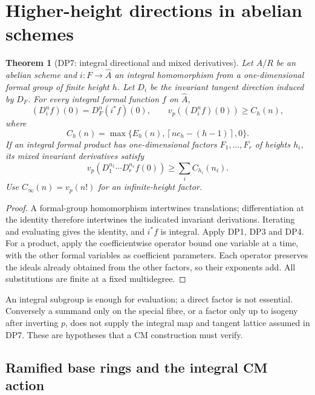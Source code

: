 \documentclass[11pt,a4paper]{article}
\newtheorem{theorem}{Theorem}[section]
\theoremstyle{definition}\newtheorem{remark}[theorem]{Remark}
\newcommand{\vp}{v_p}\newcommand{\dR}{\mathrm{dR}}\newcommand{\crys}{\mathrm{crys}}
\newcommand{\ceil}[1]{\left\lceil #1\right\rceil}\newcommand{\floor}[1]{\left\lfloor #1\right\rfloor}
\begin{document}
\section{Higher-height directions in abelian schemes}

\begin{theorem}[DP7: integral directional and mixed derivatives]\label{DP7}
Let $A/R$ be an abelian scheme and $i:F\to\widehat A$ an integral homomorphism from a one-dimensional formal group of finite height $h$. Let $D_i$ be the invariant tangent direction induced by $D_F$. For every integral formal function $f$ on $\widehat A$,
\[
 (D_i^nf)(0)=D_F^n(i^*f)(0),\qquad
 \vp((D_i^nf)(0))\ge C_h(n),
\]
where
\[
 C_h(n)=\max\{E_h(n),\ceil{nc_h-(h-1)},0\}.
\]
If an integral formal product has one-dimensional factors $F_1,\ldots,F_r$ of heights $h_i$, its mixed invariant derivatives satisfy
\[
 \vp(D_1^{n_1}\cdots D_r^{n_r}f(0))\ge\sum_i C_{h_i}(n_i).
\]
Use $C_\infty(n)=\vp(n!)$ for an infinite-height factor.
\end{theorem}
\begin{proof}
A formal-group homomorphism intertwines translations; differentiation at the identity therefore intertwines the indicated invariant derivations. Iterating and evaluating gives the identity, and $i^*f$ is integral. Apply DP1, DP3 and DP4. For a product, apply the coefficientwise operator bound one variable at a time, with the other formal variables as coefficient parameters. Each operator preserves the ideals already obtained from the other factors, so their exponents add. All substitutions are finite at a fixed multidegree.
\end{proof}

An integral subgroup is enough for evaluation; a direct factor is not essential. Conversely a summand only on the special fibre, or a factor only up to isogeny after inverting $p$, does not supply the integral map and tangent lattice assumed in DP7. These are hypotheses that a CM construction must verify.

\subsection{Ramified base rings and the integral CM action}
\end{document}
